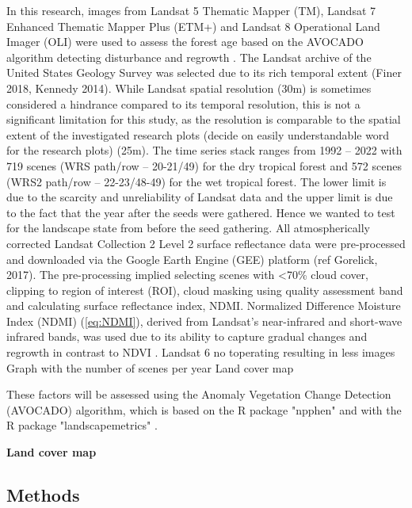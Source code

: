 In this research, images from Landsat 5 Thematic Mapper (TM), Landsat 7 Enhanced Thematic Mapper Plus (ETM+) and Landsat 8 Operational Land Imager (OLI) were used to assess the forest age based on the AVOCADO algorithm detecting disturbance and regrowth \citep{decuyperContinuousMonitoringForest2022}. The Landsat archive of the United States Geology Survey was selected due to its rich temporal extent (Finer 2018, Kennedy 2014). While Landsat spatial resolution (30m) is sometimes considered a hindrance compared to its temporal resolution, this is not a significant limitation for this study, as the resolution is comparable to the spatial extent of the investigated research plots (decide on easily understandable word for the research plots) (25m).
The time series stack ranges from 1992 – 2022 with 719 scenes (WRS path/row – 20-21/49)  for the dry tropical forest and 572 scenes (WRS2 path/row – 22-23/48-49) for the wet tropical forest. The lower limit is due to the scarcity and unreliability of Landsat data and the upper limit is due to the fact that the year after the seeds were gathered. Hence we wanted to test for the landscape state from before the seed gathering. 
All atmospherically corrected Landsat Collection 2 Level 2 surface reflectance data were pre-processed and downloaded via the Google Earth Engine (GEE) platform (ref Gorelick, 2017). The pre-processing implied selecting scenes with <70\% cloud cover, clipping to region of interest (ROI), cloud masking using quality assessment band and calculating surface reflectance index, NDMI. Normalized Difference Moisture Index (NDMI) (\ref{eq:NDMI}), derived from Landsat's near-infrared and short-wave infrared bands, was used due to its ability to capture gradual changes and regrowth in contrast to NDVI \citep{vermotePreliminaryAnalysisPerformance2016}. 
Landsat 6 no toperating resulting in less images
Graph with the number of scenes per year
Land cover map



These factors will be assessed using the Anomaly Vegetation Change Detection (AVOCADO) algorithm, which is based on the R package "npphen" and with the R package "landscapemetrics" \citep{decuyperContinuousMonitoringForest2022, chavez2017npphen, hesselbarth2019landscapemetrics}. 

\textbf{Land cover map}\\



\subsection{Methods}
